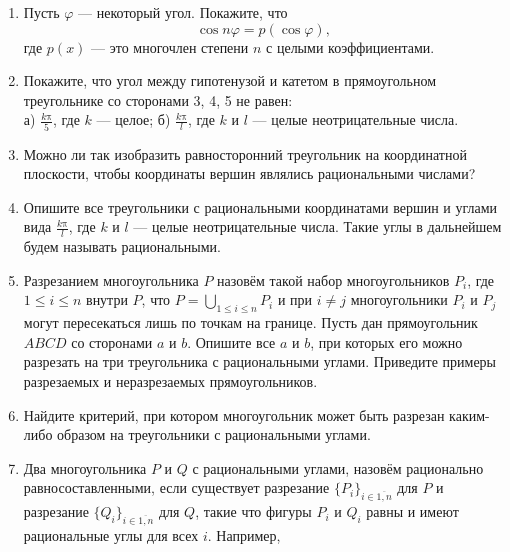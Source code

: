 \begin{enumerate}
\item Пусть $\varphi$ --- некоторый угол. Покажите, что 
$$\cos n\varphi=p(\cos\varphi),$$
где $p(x)$ --- это многочлен степени $n$ с целыми коэффициентами.
\item Покажите, что угол между гипотенузой и катетом в прямоугольном треугольнике со сторонами 3, 4, 5 не равен:\\
а) $\tfrac{k\text{π}}{5}$, где $k$ --- целое;   б) $\tfrac{k\text{π}}{l}$, где $k$ и $l$ --- целые неотрицательные числа.
\item Можно ли так изобразить равносторонний треугольник на координатной плоскости, чтобы координаты вершин являлись рациональными числами?
\item Опишите все треугольники с рациональными координатами вершин и углами вида $\tfrac{k\text{π}}{l}$, где $k$ и $l$ --- целые неотрицательные числа. Такие углы в дальнейшем будем называть рациональными.
\item Разрезанием многоугольника $P$ назовём такой набор многоугольников $P_i$, где $1\leq i\leq n$ внутри $P$, что $P=\bigcup_{1\leq i\leq n} P_i$ и при $i\neq j$ многоугольники $P_i$ и $P_j$ могут пересекаться лишь по точкам на границе.
Пусть дан прямоугольник $ABCD$ со сторонами $a$ и $b$. Опишите все $a$ и $b$, при которых его можно разрезать на три треугольника с рациональными углами. Приведите примеры разрезаемых и неразрезаемых прямоугольников.
\item Найдите критерий, при котором многоугольник может быть разрезан каким-либо образом на треугольники с рациональными углами.
\item Два многоугольника $P$ и $Q$ с рациональными углами,  назовём рационально равносоставленными, если существует разрезание $\{P_i\}_{i\in \overline{1,n}}$ для $P$ и разрезание $\{Q_i\}_{i\in \overline{1,n}}$ для $Q$, такие что фигуры $P_i$ и $Q_i$ равны и имеют рациональные углы для всех $i$. Например, 
\begin{figure}[h]
\begin{center}
\end{center}
\end{figure}
\end{enumerate}
